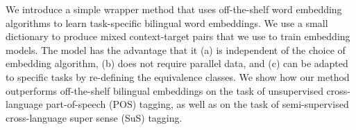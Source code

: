 We introduce a simple wrapper method that uses off-the-shelf word embedding algorithms to learn task-specific bilingual word embeddings. We use a small dictionary to produce mixed context-target pairs that we use to train embedding models. The model has the advantage that it (a) is independent of the choice of embedding algorithm, (b) does not require parallel data, and (c) can be adapted to specific tasks by re-defining the equivalence classes. We show how our method outperforms off-the-shelf bilingual embeddings on the task of unsupervised cross-language part-of-speech (POS) tagging, as well as on the task of semi-supervised cross-language super sense (SuS) tagging.
